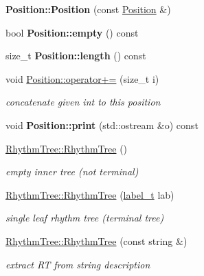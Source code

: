 \begin{DoxyCompactItemize}
{\bfseries Position\+::\+Position} (const \mbox{\hyperlink{classPosition}{Position}} \&)
\item 
\mbox{\label{group__output_ga886868520756636e98110cdb06349326}} 
bool {\bfseries Position\+::empty} () const
\item 
\mbox{\label{group__output_ga009f3b456aa0995413db1b8c0bd6f374}} 
size\+\_\+t {\bfseries Position\+::length} () const
\item 
void \mbox{\hyperlink{group__output_gab6b7dd5c2869fb23755faee32f1e6731}{Position\+::operator+=}} (size\+\_\+t i)
\begin{DoxyCompactList}\small\item\em concatenate given int to this position \end{DoxyCompactList}\item 
\mbox{\label{group__output_ga19d238e39cbe5a9f03929473bbd5b745}} 
void {\bfseries Position\+::print} (std\+::ostream \&o) const
\item 
\mbox{\hyperlink{group__output_gac7614a6239a4917c771641dfdfd597ab}{Rhythm\+Tree\+::\+Rhythm\+Tree}} ()
\begin{DoxyCompactList}\small\item\em empty inner tree (not terminal) \end{DoxyCompactList}\item 
\mbox{\label{group__output_gac868521df843e116ef04bcfa52405d01}} 
\mbox{\hyperlink{group__output_gac868521df843e116ef04bcfa52405d01}{Rhythm\+Tree\+::\+Rhythm\+Tree}} (\mbox{\hyperlink{group__output_ga22fde970e635fcf63962743b2d5c441d}{label\+\_\+t}} lab)
\begin{DoxyCompactList}\small\item\em single leaf rhythm tree (terminal tree) \end{DoxyCompactList}\item 
\mbox{\label{group__output_ga058c6d59881e1be259594165d19c8588}} 
\mbox{\hyperlink{group__output_ga058c6d59881e1be259594165d19c8588}{Rhythm\+Tree\+::\+Rhythm\+Tree}} (const string \&)
\begin{DoxyCompactList}\small\item\em extract RT from string description \end{DoxyCompactList}\item 

\end{DoxyCompactItemize}
